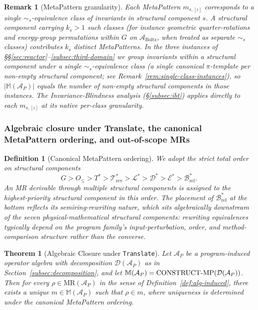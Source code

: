 \documentclass[acmsmall,screen,review]{acmart}
\newtheorem{theorem}{Theorem}
\newtheorem{definition}{Definition}
\newtheorem{remark}{Remark}
\begin{document}
\begin{remark}[MetaPattern granularity]
\label{rem:mp-per-class}
Each MetaPattern $m_{s,[\iota]}$ corresponds to a single $\sim_s$-equivalence class of invariants in structural component $s$. A structural component carrying $k_s > 1$ such classes (for instance geometric quarter-rotations and energy-group permutations within $G$ on $\mathcal{A}_{\mathrm{Boltz}}$, when treated as separate $\sim_s$ classes) contributes $k_s$ distinct MetaPatterns. In the three instances of \S\S\ref{sec:reactor}--\ref{subsec:third-domain} we group invariants within a structural component under a single $\sim_s$-equivalence class (a single canonical $\pi$-template per non-empty structural component; see Remark~\ref{rem:single-class-instances}), so $|\mathbb{M}(\mathcal{A}_{P})|$ equals the number of non-empty structural components in those instances. The Invariance-Blindness analysis (\S\ref{subsec:ibt}) applies directly to each $m_{s,[\iota]}$ at its native per-class granularity.
\end{remark}

\subsubsection{Algebraic closure under Translate, the canonical MetaPattern ordering, and out-of-scope MRs}
\label{subsec:completeness}

\begin{definition}[Canonical MetaPattern ordering]
\label{def:canonical-order}
We adopt the strict total order on structural components
$$G > O_{\le} > T^{*} > \mathcal{T}^{*}_{\mathrm{rev}} > \mathcal{L}^{*} > \mathcal{D}^{*} > \mathcal{E}^{*} > \mathcal{B}^{*}_{\mathrm{rel}}.$$
An MR derivable through multiple structural components is assigned to the highest-priority structural component in this order. The placement of $\mathcal{B}^{*}_{\mathrm{rel}}$ at the bottom reflects its semiring-rewriting nature, which sits algebraically downstream of the seven physical-mathematical structural components: rewriting equivalences typically depend on the program family's input-perturbation, order, and method-comparison structure rather than the converse.
\end{definition}

\begin{theorem}[Algebraic Closure under \texttt{Translate}]
\label{thm:closure}
Let $\mathcal{A}_P$ be a program-induced operator algebra with decomposition $\mathcal{D}(\mathcal{A}_P)$ as in Section~\ref{subsec:decomposition}, and let $\mathbb{M}(\mathcal{A}_P) = \mathrm{CONSTRUCT\textnormal{-}MP}(\mathcal{D}(\mathcal{A}_P))$. Then for every $\rho \in \mathrm{MR}(\mathcal{A}_P)$ in the sense of Definition~\ref{def:alg-induced}, there exists a unique $m \in \mathbb{M}(\mathcal{A}_P)$ such that $\rho \in m$, where uniqueness is determined under the canonical MetaPattern ordering.
\end{theorem}
\end{document}
